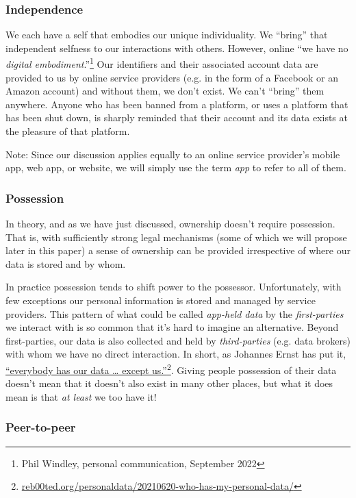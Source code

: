 \documentclass[11pt, oneside]{article}   	%
\newcommand{\hyperfootnote}[1][]{\def\ArgI{{#1}}\hyperfootnoteRelay}
\newcommand\hyperfootnoteRelay[2][]{\href{#1#2}{\ArgI}\footnote{\href{#1#2}{#2}}}
\begin{document}
\subsubsection{Independence} 

We each have a self that embodies our unique individuality. We ``bring'' that independent selfness to our interactions with others. However, online ``we have no \emph{digital embodiment}.''\footnote{Phil Windley, personal communication, September 2022} Our identifiers and their associated account data are provided to us by online service providers (e.g. in the form of a Facebook or an Amazon account) and without them, we don't exist. We can't ``bring'' them anywhere. Anyone who has been banned from a platform, or uses a platform that has been shut down, is sharply reminded that their account and its data exists at the pleasure of that platform. 

Note: Since our discussion applies equally to an online service provider's mobile app, web app, or website, we will simply use the term \emph{app} to refer to all of them.

\subsubsection{Possession} 

In theory, and as we have just discussed, ownership doesn't require possession. That is, with sufficiently strong legal mechanisms (some of which we will propose later in this paper) a sense of ownership can be provided irrespective of where our data is stored and by whom. 

In practice possession tends to shift power to the possessor. Unfortunately, with few exceptions our personal information is stored and managed by service providers. This pattern of what could be called \emph{app-held data} by the \emph{first-parties} we interact with is so common that it's hard to imagine an alternative. Beyond first-parties, our data is also collected and held by \emph{third-parties} (e.g. data brokers) with whom we have no direct interaction. In short, as Johannes Ernst has put it, \hyperfootnote[“everybody has our data … except us.”][https://]{reb00ted.org/personaldata/20210620-who-has-my-personal-data/}. Giving people possession of their data doesn't mean that it doesn't also exist in many other places, but what it does mean is that \emph{at least} we too have it!

\subsubsection{Peer-to-peer}
\end{document}
